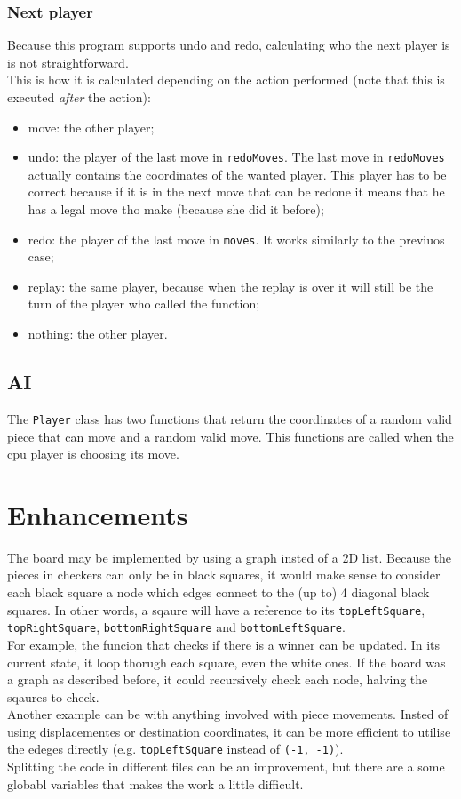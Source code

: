 \documentclass[10pt, a4paper]{article}
\begin{document}
	\subsubsection{Next player}
	\label{subsubsec:nextplayer}
	Because this program supports undo and redo, calculating who the next player is is not straightforward.\\
	This is how it is calculated depending on the action performed (note that this is executed \textit{after} the action):
	\begin{itemize}
		\item move: the other player;
		\item undo: the player of the last move in \texttt{redoMoves}. The last move in \texttt{redoMoves} actually contains the coordinates of the wanted player. This player has to be correct because if it is in the next move that can be redone it means that he has a legal move tho make (because she did it before);
		\item redo: the player of the last move in \texttt{moves}. It works similarly to the previuos case;
		\item replay: the same player, because when the replay is over it will still be the turn of the player who called the function;
		\item nothing: the other player.
	\end{itemize}

	\subsection{AI}
	The \texttt{Player} class has two functions that return the coordinates of a random valid piece that can move and a random valid move. This functions are called when the cpu player is choosing its move.\\
	
	\section{Enhancements}
	The board may be implemented by using a graph insted of a 2D list. Because the pieces in checkers can only be in black squares, it would make sense to consider each black square a node which edges connect to the (up to) 4 diagonal black squares. In other words, a sqaure will have a reference to its \texttt{topLeftSquare}, \texttt{topRightSquare}, \texttt{bottomRightSquare} and \texttt{bottomLeftSquare}.\\
	For example, the funcion that checks if there is a winner can be updated. In its current state, it loop thorugh each square, even the white ones. If the board was a graph as described before, it could recursively check each node, halving the sqaures to check.\\
	Another example can be with anything involved with piece movements. Insted of using displacementes or destination coordinates, it can be more efficient to utilise the edeges directly (e.g. \texttt{topLeftSquare} instead of \texttt{(-1, -1)}).\\
	Splitting the code in different files can be an improvement, but there are a some globabl variables that makes the work a little difficult.
	
\end{document}
